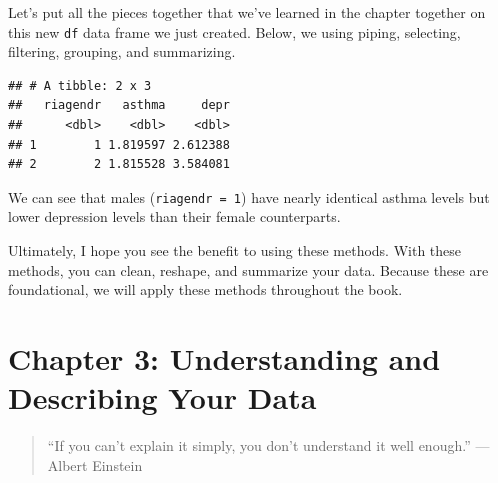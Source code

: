 \documentclass[]{tufte-book}
\newenvironment{Shaded}{}{}
\newcommand{\KeywordTok}[1]{\textcolor[rgb]{0.00,0.44,0.13}{\textbf{#1}}}
\newcommand{\DataTypeTok}[1]{\textcolor[rgb]{0.56,0.13,0.00}{#1}}
\newcommand{\DecValTok}[1]{\textcolor[rgb]{0.25,0.63,0.44}{#1}}
\newcommand{\StringTok}[1]{\textcolor[rgb]{0.25,0.44,0.63}{#1}}
\newcommand{\OtherTok}[1]{\textcolor[rgb]{0.00,0.44,0.13}{#1}}
\newcommand{\OperatorTok}[1]{\textcolor[rgb]{0.40,0.40,0.40}{#1}}
\newcommand{\NormalTok}[1]{#1}
\theoremstyle{definition}
\theoremstyle{definition}
\theoremstyle{remark}
\begin{document}
Let's put all the pieces together that we've learned in the chapter
together on this new \texttt{df} data frame we just created. Below, we
using piping, selecting, filtering, grouping, and summarizing.

\begin{Shaded}
\end{Shaded}

\begin{verbatim}
## # A tibble: 2 x 3
##   riagendr   asthma     depr
##      <dbl>    <dbl>    <dbl>
## 1        1 1.819597 2.612388
## 2        2 1.815528 3.584081
\end{verbatim}

We can see that males (\texttt{riagendr\ =\ 1}) have nearly identical
asthma levels but lower depression levels than their female
counterparts.

Ultimately, I hope you see the benefit to using these methods. With
these methods, you can clean, reshape, and summarize your data. Because
these are foundational, we will apply these methods throughout the book.

\chapter*{Chapter 3: Understanding and Describing Your
Data}\label{chapter-3-understanding-and-describing-your-data}

\begin{quote}
``If you can't explain it simply, you don't understand it well enough.''
--- Albert Einstein
\end{quote}
\end{document}
